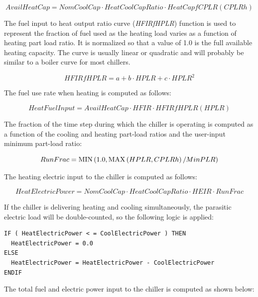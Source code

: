 \begin{equation}
AvailHeatCap = NomCoolCap \cdot HeatCoolCapRatio \cdot HeatCapfCPLR(CPLRh)
\end{equation}

The fuel input to heat output ratio curve (\emph{HFIRfHPLR}) function is used to represent the fraction of fuel used as the heating load varies as a function of heating part load ratio. It is normalized so that a value of 1.0 is the full available heating capacity. The curve is usually linear or quadratic and will probably be similar to a boiler curve for most chillers.

\begin{equation}
HFIRfHPLR = a + b \cdot HPLR + c \cdot HPL{R^2}
\end{equation}

The fuel use rate when heating is computed as follows:

\begin{equation}
HeatFuelInput = AvailHeatCap \cdot HFIR \cdot HFIRfHPLR(HPLR)
\end{equation}

The fraction of the time step during which the chiller is operating is computed as a function of the cooling and heating part-load ratios and the user-input minimum part-load ratio:

\begin{equation}
RunFrac = {\mathop{\rm MIN}\nolimits} \left( {1.0,{\mathop{\rm MAX}\nolimits} \left( {HPLR,CPLRh} \right)/MinPLR} \right)
\end{equation}

The heating electric input to the chiller is computed as follows:

\begin{equation}
HeatElectricPower = NomCoolCap \cdot HeatCoolCapRatio \cdot HEIR \cdot RunFrac
\end{equation}

If the chiller is delivering heating and cooling simultaneously, the parasitic electric load will be double-counted, so the following logic is applied:

\begin{lstlisting}
IF ( HeatElectricPower < = CoolElectricPower ) THEN
  HeatElectricPower = 0.0
ELSE
  HeatElectricPower = HeatElectricPower - CoolElectricPower
ENDIF
\end{lstlisting}

The total fuel and electric power input to the chiller is computed as shown below:

